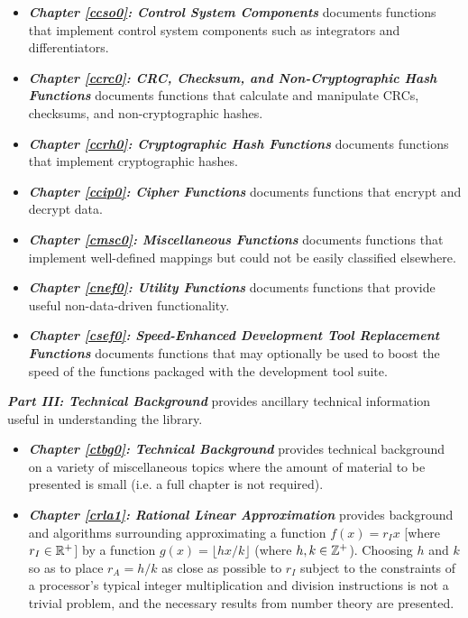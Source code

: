 \begin{itemize}
\item \emph{\textbf{Chapter \ref{ccso0}: Control System Components}}
      documents functions that implement control system components such as 
      integrators and differentiators.
\item \emph{\textbf{Chapter \ref{ccrc0}: CRC, Checksum, and Non-Cryptographic Hash Functions}}
      documents functions that calculate and manipulate
      CRCs, checksums, and non-cryptographic hashes.
\item \emph{\textbf{Chapter \ref{ccrh0}: Cryptographic Hash Functions}}
      documents functions that implement cryptographic hashes.
\item \emph{\textbf{Chapter \ref{ccip0}: Cipher Functions}}
      documents functions that encrypt and decrypt data.
\item \emph{\textbf{Chapter \ref{cmsc0}: Miscellaneous Functions}}
      documents functions that implement well-defined mappings but could not
      be easily classified elsewhere.
\item \emph{\textbf{Chapter \ref{cnef0}: Utility Functions}}
      documents functions that provide useful non-data-driven
      functionality.
\item \emph{\textbf{Chapter \ref{csef0}: Speed-Enhanced Development Tool Replacement Functions}}
      documents functions that may optionally be used to 
      boost the speed of the functions packaged with the development tool suite.
\end{itemize}

\emph{\textbf{Part III: Technical Background}} provides 
ancillary technical information useful in understanding
the library.

\begin{itemize}
\item \emph{\textbf{Chapter \ref{ctbg0}: Technical Background}}
      provides technical background on a variety of miscellaneous
      topics where the amount of material to be presented
      is small (i.e. a full chapter is not required).
\item \emph{\textbf{Chapter \ref{crla1}: Rational Linear Approximation}}
      provides background and algorithms surrounding approximating
      a function $f(x) = r_I x$ [where $r_I \in{\mathbb{R}^+}$]
      by a function 
      $g(x) = \lfloor hx/k \rfloor$ (where
      $h, k \in {\mathbb{Z}^+}$)\@.
      Choosing $h$ and $k$ so as to place
      $r_A = h/k$ as close as possible to $r_I$ 
      subject to the constraints of a processor's
      typical integer multiplication and division instructions is not a trivial
      problem, and the necessary results from number theory
      are presented.
\end{itemize}

